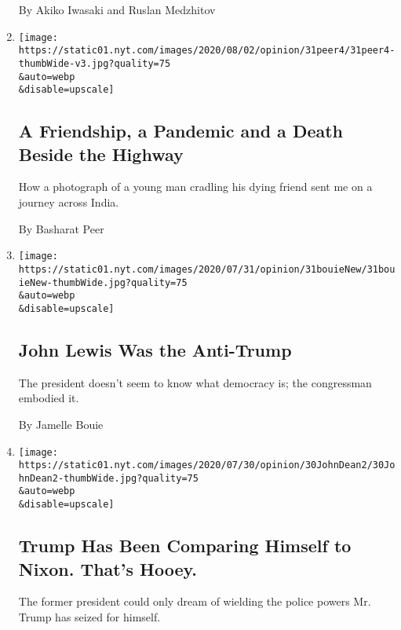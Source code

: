 \begin{enumerate}
  By Akiko Iwasaki and Ruslan Medzhitov
\item
  \href{/2020/07/31/opinion/sunday/India-migration-coronavirus.html}{}

  \texttt{[image: https://static01.nyt.com/images/2020/08/02/opinion/31peer4/31peer4-thumbWide-v3.jpg?quality=75\\\&auto=webp\\\&disable=upscale]}

  \hypertarget{a-friendship-a-pandemic-and-a-death-beside-the-highway}{%
  \subsection{A Friendship, a Pandemic and a Death Beside the
  Highway}\label{a-friendship-a-pandemic-and-a-death-beside-the-highway}}

  How a photograph of a young man cradling his dying friend sent me on a
  journey across India.

  By Basharat Peer
\item
  \href{/2020/07/31/opinion/john-lewis-trump-election-2020.html}{}

  \texttt{[image: https://static01.nyt.com/images/2020/07/31/opinion/31bouieNew/31bouieNew-thumbWide.jpg?quality=75\\\&auto=webp\\\&disable=upscale]}

  \hypertarget{john-lewis-was-the-anti-trump}{%
  \subsection{John Lewis Was the
  Anti-Trump}\label{john-lewis-was-the-anti-trump}}

  The president doesn't seem to know what democracy is; the congressman
  embodied it.

  By Jamelle Bouie
\item
  \href{/2020/07/31/opinion/trump-nixon-authoritarianism.html}{}

  \texttt{[image: https://static01.nyt.com/images/2020/07/30/opinion/30JohnDean2/30JohnDean2-thumbWide.jpg?quality=75\\\&auto=webp\\\&disable=upscale]}

  \hypertarget{trump-has-been-comparing-himself-to-nixon-thats-hooey}{%
  \subsection{Trump Has Been Comparing Himself to Nixon. That's
  Hooey.}\label{trump-has-been-comparing-himself-to-nixon-thats-hooey}}

  The former president could only dream of wielding the police powers
  Mr. Trump has seized for himself.


\end{enumerate}
